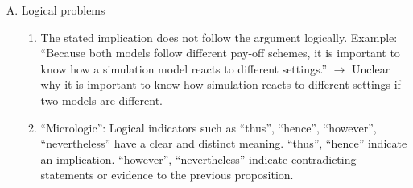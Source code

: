 \documentclass{tufte-book}
\begin{document}
\begin{enumerate}[(A)]
\item Logical problems
\begin{enumerate}
	\item The stated implication does not follow the argument logically. Example: ``Because both models follow different pay-off schemes, it is important to know how a simulation model reacts to different settings.'' $\rightarrow$ Unclear why it is important to know how simulation reacts to different settings if two models are different.
	\item ``Micrologic'': Logical indicators such as ``thus'', ``hence'', ``however'', ``nevertheless'' have a clear and distinct meaning. ``thus'', ``hence'' indicate an implication. ``however'', ``nevertheless'' indicate contradicting statements or evidence to the previous proposition.
\end{enumerate}



\end{enumerate}
\end{document}
